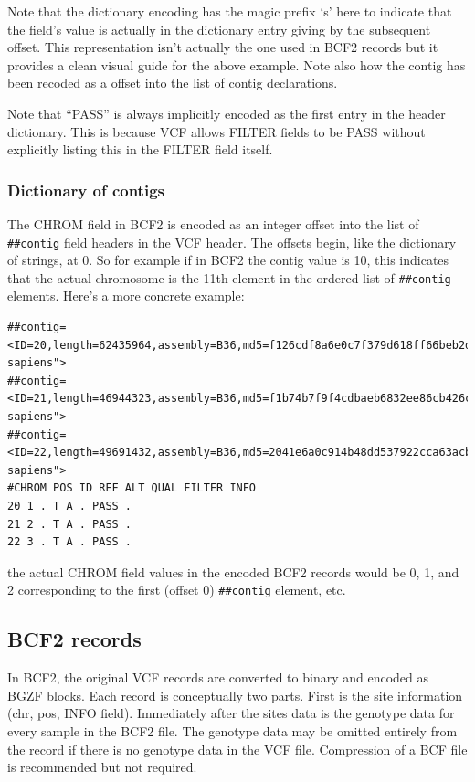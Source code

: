 \documentclass[8pt]{article}
\begin{document}
Note that the dictionary encoding has the magic prefix `s' here to indicate that the field's value is actually in the dictionary entry giving by the subsequent offset.
This representation isn't actually the one used in BCF2 records but it provides a clean visual guide for the above example.
Note also how the contig has been recoded as a offset into the list of contig declarations.

Note that ``PASS'' is always implicitly encoded as the first entry in the header dictionary.
This is because VCF allows FILTER fields to be PASS without explicitly listing this in the FILTER field itself.


\subsubsection{Dictionary of contigs}

The CHROM field in BCF2 is encoded as an integer offset into the list of \verb|##contig| field headers in the VCF header.
The offsets begin, like the dictionary of strings, at 0.
So for example if in BCF2 the contig value is 10, this indicates that the actual chromosome is the 11th element in the ordered list of \verb|##contig| elements.
Here's a more concrete example:

\small
\begin{verbatim}
##contig=<ID=20,length=62435964,assembly=B36,md5=f126cdf8a6e0c7f379d618ff66beb2da,species="Homo sapiens">
##contig=<ID=21,length=46944323,assembly=B36,md5=f1b74b7f9f4cdbaeb6832ee86cb426c6,species="Homo sapiens">
##contig=<ID=22,length=49691432,assembly=B36,md5=2041e6a0c914b48dd537922cca63acb8,species="Homo sapiens">
#CHROM POS ID REF ALT QUAL FILTER INFO
20 1 . T A . PASS .
21 2 . T A . PASS .
22 3 . T A . PASS .
\end{verbatim}
\normalsize

the actual CHROM field values in the encoded BCF2 records would be 0, 1, and 2 corresponding to the first (offset 0) \verb|##contig| element, etc.

\subsection{BCF2 records}

In BCF2, the original VCF records are converted to binary and encoded as BGZF blocks.
Each record is conceptually two parts.
First is the site information (chr, pos, INFO field).
Immediately after the sites data is the genotype data for every sample in the BCF2 file.
The genotype data may be omitted entirely from the record if there is no genotype data in the VCF file.
Compression of a BCF file is recommended but not required.
\end{document}
